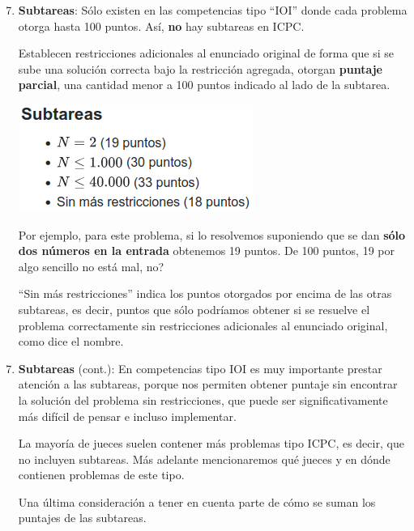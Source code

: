 \documentclass{beamer}
\begin{document}
    \begin{frame}[noframenumbering]
        \begin{enumerate}
            \setcounter{enumi}{6}
            \item \textbf{Subtareas}: Sólo existen en las competencias tipo ``IOI'' donde cada problema otorga hasta 100 puntos. Así, \textbf{no} hay subtareas en ICPC. \pause

                Establecen restricciones adicionales al enunciado original de forma que si se sube una solución correcta bajo la restricción agregada, otorgan \textbf{puntaje parcial}, una cantidad menor a 100 puntos indicado al lado de la subtarea. \pause

            \begin{center}
                \includegraphics[width=.4\linewidth]{./ou_subtasks.png}
            \end{center}\pause

            Por ejemplo, para este problema, si lo resolvemos suponiendo que se dan \textbf{sólo dos números en la entrada} obtenemos 19 puntos. \pause De 100 puntos, 19 por algo sencillo no está mal, no? \pause

            ``Sin más restricciones'' indica los puntos otorgados por encima de las otras subtareas, es decir, puntos que sólo podríamos obtener si se resuelve el problema correctamente sin restricciones adicionales al enunciado original, como dice el nombre.
        \end{enumerate}
    \end{frame}

    \begin{frame}[noframenumbering]
        \begin{enumerate}
            \setcounter{enumi}{6}
            \item \textbf{Subtareas} (cont.): En competencias tipo IOI es muy importante prestar atención a las subtareas, porque nos permiten obtener puntaje sin encontrar la solución del problema sin restricciones, que puede ser significativamente más difícil de pensar e incluso implementar. \pause \vspace{4pt}

            La mayoría de jueces suelen contener más problemas tipo ICPC, es decir, que no incluyen subtareas. Más adelante mencionaremos qué jueces y en dónde contienen problemas de este tipo. \pause \vspace{4pt}

            Una última consideración a tener en cuenta parte de cómo se suman los puntajes de las subtareas. 
        \end{enumerate}
    \end{frame}
\end{document}
